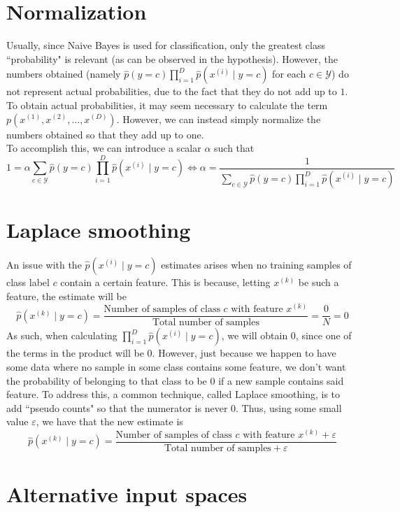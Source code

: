 \documentclass[12pt]{article}
\begin{document}
\section{Normalization}

Usually, since Naive Bayes is used for classification, only the greatest class ``probability" is relevant (as can be observed in the hypothesis). However, the numbers obtained (namely $\hat{p}(y = c)\prod_{i=1}^{D}\hat{p}(x^{(i)} \mid y = c)$ for each $c \in \mathcal{Y}$) do not represent actual probabilities, due to the fact that they do not add up to $1$. To obtain actual probabilities, it may seem necessary to calculate the term $p(x^{(1)}, x^{(2)}, \dots, x^{(D)})$. However, we can instead simply normalize the numbers obtained so that they add up to one.
\\\newline
To accomplish this, we can introduce a scalar $\alpha$ such that
\[ 1 = \alpha\sum_{c\in\mathcal{Y}}\hat{p}(y = c)\prod_{i=1}^{D}\hat{p}(x^{(i)} \mid y = c) \iff \alpha = \frac{1}{\sum_{c\in\mathcal{Y}}\hat{p}(y = c)\prod_{i=1}^{D}\hat{p}(x^{(i)} \mid y = c)} \]

\section{Laplace smoothing}

An issue with the $\hat{p}(x^{(i)} \mid y = c)$ estimates arises when no training samples of class label $c$ contain a certain feature. This is because, letting $x^{(k)}$ be such a feature, the estimate will be
\[ \hat{p}(x^{(k)} \mid y = c) = \frac{\text{Number of samples of class } c \text{ with feature } x^{(k)}}{\text{Total number of samples}} = \frac{0}{N} = 0 \]
As such, when calculating $\prod_{i=1}^{D}\hat{p}(x^{(i)} \mid y = c)$, we will obtain $0$, since one of the terms in the product will be $0$. However, just because we happen to have some data where no sample in some class contains some feature, we don't want the probability of belonging to that class to be $0$ if a new sample contains said feature. To address this, a common technique, called Laplace smoothing, is to add ``pseudo counts" so that the numerator is never $0$. Thus, using some small value $\varepsilon$, we have that the new estimate is
\[ \hat{p}(x^{(k)} \mid y = c) = \frac{\text{Number of samples of class } c \text{ with feature } x^{(k)} + \varepsilon}{\text{Total number of samples} + \varepsilon} \]

\section{Alternative input spaces}
\end{document}
